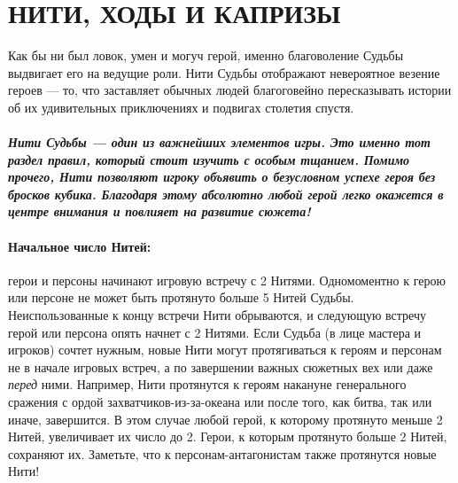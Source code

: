 \section{НИТИ, ХОДЫ И КАПРИЗЫ}
Как бы ни был ловок, умен и могуч герой, именно благоволение Судьбы выдвигает его на ведущие роли. Нити Судьбы отображают невероятное везение героев — то, что заставляет обычных людей благоговейно пересказывать истории об их удивительных приключениях и подвигах столетия спустя.
\paragraph{\textit{Нити Судьбы — один из важнейших элементов игры. Это именно тот раздел правил, который стоит изучить с особым тщанием. Помимо прочего, Нити позволяют игроку объявить о безусловном успехе героя без бросков кубика. Благодаря этому абсолютно любой герой легко окажется в центре внимания и повлияет на развитие сюжета!}}
\paragraph{Начальное число Нитей:} герои и персоны начинают игровую встречу с 2 Нитями. Одномоментно к герою или персоне не может быть протянуто больше 5 Нитей Судьбы. Неиспользованные к концу встречи Нити обрываются, и следующую встречу герой или персона опять начнет с 2 Нитями.
\newline
Если Судьба (в лице мастера и игроков) сочтет нужным, новые Нити могут протягиваться к героям и персонам не в начале игровых встреч, а по завершении важных сюжетных вех или даже \textit{перед} ними. Например, Нити протянутся к героям накануне генерального сражения с ордой захватчиков-из-за-океана или после того, как битва, так или иначе, завершится. В этом случае любой герой, к которому протянуто меньше 2 Нитей, увеличивает их число до 2. Герои, к которым протянуто больше 2 Нитей, сохраняют их. Заметьте, что к персонам-антагонистам также протянутся новые Нити!
